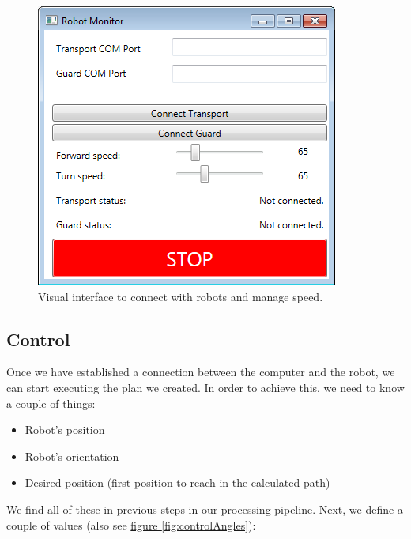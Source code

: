 \documentclass[10pt, abstracton, twocolumn]{scrartcl}
\newcommand{\fref}[1]{\hyperref[#1]{figure \vref{#1}}}
\begin{document}
\begin{figure}[h]
		\centering
		\includegraphics[width=\columnwidth]{pictures/robotInterface.png}
        \caption{\small Visual interface to connect with robots and manage speed.}
        \label{fig:robotInterface}
\end{figure}

\subsection{Control}

\begin{samepage}

Once we have established a connection between the computer and the robot, we can start executing the plan we created. In order to achieve this, we need to know a couple of things:
\nopagebreak
\begin{itemize}
        \item Robot's position
        \item Robot's orientation
        \item Desired position (first position to reach in the calculated path)
\end{itemize}

\end{samepage}

We find all of these in previous steps in our processing pipeline. Next, we define a couple of values (also see \fref{fig:controlAngles}):
\end{document}

